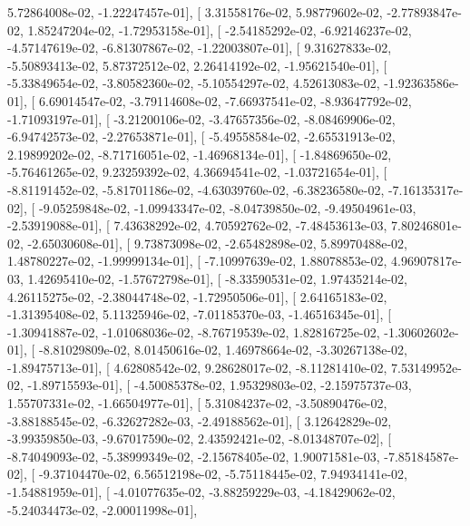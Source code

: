 \documentclass{article}
\begin{document}
          5.72864008e-02,  -1.22247457e-01],
       [  3.31558176e-02,   5.98779602e-02,  -2.77893847e-02,
          1.85247204e-02,  -1.72953158e-01],
       [ -2.54185292e-02,  -6.92146237e-02,  -4.57147619e-02,
         -6.81307867e-02,  -1.22003807e-01],
       [  9.31627833e-02,  -5.50893413e-02,   5.87372512e-02,
          2.26414192e-02,  -1.95621540e-01],
       [ -5.33849654e-02,  -3.80582360e-02,  -5.10554297e-02,
          4.52613083e-02,  -1.92363586e-01],
       [  6.69014547e-02,  -3.79114608e-02,  -7.66937541e-02,
         -8.93647792e-02,  -1.71093197e-01],
       [ -3.21200106e-02,  -3.47657356e-02,  -8.08469906e-02,
         -6.94742573e-02,  -2.27653871e-01],
       [ -5.49558584e-02,  -2.65531913e-02,   2.19899202e-02,
         -8.71716051e-02,  -1.46968134e-01],
       [ -1.84869650e-02,  -5.76461265e-02,   9.23259392e-02,
          4.36694541e-02,  -1.03721654e-01],
       [ -8.81191452e-02,  -5.81701186e-02,  -4.63039760e-02,
         -6.38236580e-02,  -7.16135317e-02],
       [ -9.05259848e-02,  -1.09943347e-02,  -8.04739850e-02,
         -9.49504961e-03,  -2.53919088e-01],
       [  7.43638292e-02,   4.70592762e-02,  -7.48453613e-03,
          7.80246801e-02,  -2.65030608e-01],
       [  9.73873098e-02,  -2.65482898e-02,   5.89970488e-02,
          1.48780227e-02,  -1.99999134e-01],
       [ -7.10997639e-02,   1.88078853e-02,   4.96907817e-03,
          1.42695410e-02,  -1.57672798e-01],
       [ -8.33590531e-02,   1.97435214e-02,   4.26115275e-02,
         -2.38044748e-02,  -1.72950506e-01],
       [  2.64165183e-02,  -1.31395408e-02,   5.11325946e-02,
         -7.01185370e-03,  -1.46516345e-01],
       [ -1.30941887e-02,  -1.01068036e-02,  -8.76719539e-02,
          1.82816725e-02,  -1.30602602e-01],
       [ -8.81029809e-02,   8.01450616e-02,   1.46978664e-02,
         -3.30267138e-02,  -1.89475713e-01],
       [  4.62808542e-02,   9.28628017e-02,  -8.11281410e-02,
          7.53149952e-02,  -1.89715593e-01],
       [ -4.50085378e-02,   1.95329803e-02,  -2.15975737e-03,
          1.55707331e-02,  -1.66504977e-01],
       [  5.31084237e-02,  -3.50890476e-02,  -3.88188545e-02,
         -6.32627282e-03,  -2.49188562e-01],
       [  3.12642829e-02,  -3.99359850e-03,  -9.67017590e-02,
          2.43592421e-02,  -8.01348707e-02],
       [ -8.74049093e-02,  -5.38999349e-02,  -2.15678405e-02,
          1.90071581e-03,  -7.85184587e-02],
       [ -9.37104470e-02,   6.56512198e-02,  -5.75118445e-02,
          7.94934141e-02,  -1.54881959e-01],
       [ -4.01077635e-02,  -3.88259229e-03,  -4.18429062e-02,
         -5.24034473e-02,  -2.00011998e-01],
\end{document}
